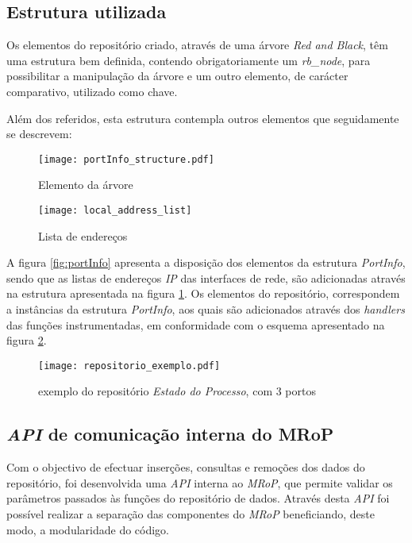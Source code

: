 \subsection{Estrutura utilizada}
\label{sub:repo_structure}

Os elementos do repositório criado, através de uma árvore \textit{Red and Black}, têm uma estrutura bem definida, contendo obrigatoriamente um \textit{rb\_node}, para possibilitar a manipulação da árvore e um outro elemento, de carácter comparativo, utilizado como chave.

Além dos referidos, esta estrutura contempla outros elementos que seguidamente se descrevem:

\begin{figure}[ht]
\begin{minipage}[b]{0.5\linewidth}
\centering
\texttt{[image: portInfo\_structure.pdf]}
\caption{Elemento da árvore}
\label{fig:portInfo}
\end{minipage}
\hspace{0.5cm}
\begin{minipage}[b]{0.5\linewidth}
\centering
\texttt{[image: local\_address\_list]}
\caption{Lista de endereços}
\label{fig:local_address_list}
\end{minipage}
\end{figure}

A figura \ref{fig:portInfo} apresenta a disposição dos elementos da estrutura \textit{PortInfo}, sendo que as listas de endereços \textit{IP} das interfaces de rede, são adicionadas através na estrutura apresentada na figura \ref{fig:local_address_list}.
Os elementos do repositório, correspondem a instâncias da estrutura \textit{PortInfo}, aos quais são adicionados através dos \textit{handlers} das funções instrumentadas, em conformidade com o esquema apresentado na figura \ref{fig:repo_example}.

\begin{figure}[!htbp]
\centering
\texttt{[image: repositorio\_exemplo.pdf]}
\caption{exemplo do repositório \textit{Estado do Processo}, com 3 portos}
\label{fig:repo_example}
\end{figure}

\subsection{\textit{API} de comunicação interna do MRoP}
\label{sub:repo_api}

Com o objectivo de efectuar inserções, consultas e remoções dos dados do repositório, foi desenvolvida uma \textit{API} interna ao \textit{MRoP}, que permite validar os parâmetros passados às funções do repositório de dados.
Através desta \textit{API} foi possível realizar a separação das componentes do \textit{MRoP} beneficiando, deste modo, a modularidade do código.

